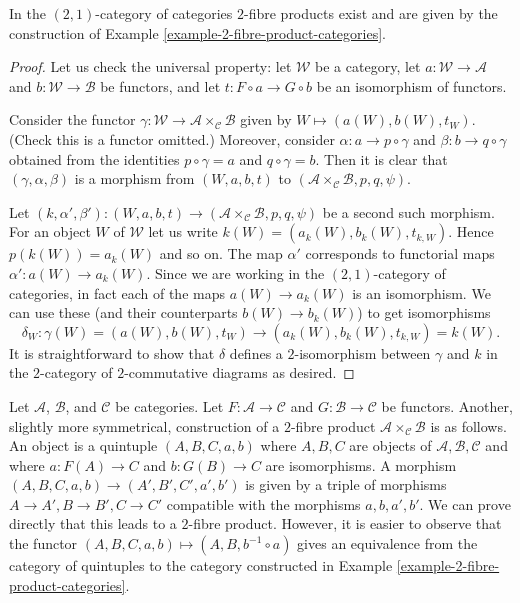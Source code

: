 \begin{lemma}
\label{lemma-2-fibre-product-categories}
In the $(2, 1)$-category of categories $2$-fibre products exist and
are given by the construction of
Example \ref{example-2-fibre-product-categories}.
\end{lemma}

\begin{proof}
Let us check the universal property:
let $\mathcal{W}$ be a category, let
$a : \mathcal{W} \to \mathcal{A}$ and
$b : \mathcal{W} \to \mathcal{B}$ be functors, and
let $t : F \circ a \to G \circ b$ be an isomorphism of functors.

\medskip\noindent
Consider the functor
$\gamma : \mathcal{W} \to \mathcal{A} \times_\mathcal{C}\mathcal{B}$
given by $W \mapsto (a(W), b(W), t_W)$.
(Check this is a functor omitted.)
Moreover, consider $\alpha : a \to p \circ \gamma$ and
$\beta : b \to q \circ \gamma$ obtained from the identities
$p \circ \gamma = a$ and $q \circ \gamma = b$. Then it is
clear that $(\gamma, \alpha, \beta)$ is a morphism
from $(W, a, b, t)$ to
$(\mathcal{A} \times_\mathcal{C} \mathcal{B}, p, q, \psi)$.

\medskip\noindent
Let
$(k, \alpha', \beta') :
(W, a, b, t) \to (\mathcal{A} \times_\mathcal{C} \mathcal{B}, p, q, \psi)$
be a second such morphism. For an object $W$ of $\mathcal{W}$ let us write
$k(W) = (a_k(W), b_k(W), t_{k, W})$. Hence $p(k(W)) = a_k(W)$ and so on.
The map $\alpha'$ corresponds to functorial maps
$\alpha' : a(W) \to a_k(W)$. Since we are working in the
$(2, 1)$-category of categories, in fact each of the maps
$a(W) \to a_k(W)$ is an isomorphism. We can use these
(and their counterparts $b(W) \to b_k(W)$) to get isomorphisms
$$
\delta_W :
\gamma(W) = (a(W), b(W), t_W)
\longrightarrow
(a_k(W), b_k(W), t_{k, W}) = k(W).
$$
It is straightforward to show that $\delta$ defines a
$2$-isomorphism between $\gamma$ and $k$ in the $2$-category
of $2$-commutative diagrams as desired.
\end{proof}

\begin{remark}
\label{remark-other-description-2-fibre-product}
Let $\mathcal{A}$, $\mathcal{B}$, and $\mathcal{C}$ be categories.
Let $F : \mathcal{A} \to \mathcal{C}$ and $G : \mathcal{B} \to \mathcal{C}$
be functors. Another, slightly more symmetrical, construction of a $2$-fibre
product $\mathcal{A} \times_\mathcal{C} \mathcal{B}$ is as follows.
An object is a quintuple $(A, B, C, a, b)$ where $A, B, C$ are objects
of $\mathcal{A}, \mathcal{B}, \mathcal{C}$ and where $a : F(A) \to C$
and $b : G(B) \to C$ are isomorphisms. A morphism
$(A, B, C, a, b) \to (A', B', C', a', b')$ is given by a triple
of morphisms $A \to A', B \to B', C \to C'$ compatible with the morphisms
$a, b, a', b'$. We can prove directly that this leads to a $2$-fibre
product. However, it is easier to observe that the functor
$(A, B, C, a, b) \mapsto (A, B, b^{-1} \circ a)$ gives an equivalence
from the category of quintuples to the category constructed in
Example \ref{example-2-fibre-product-categories}.
\end{remark}

